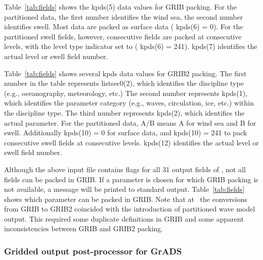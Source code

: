 Table~\ref{tab:fields} shows the {\F kpds(5)} data values for GRIB
packing. For the partitioned data, the first number identifies the wind sea,
the second number identifies swell. Most data are packed as surface data ({\F
kpds(6) = 0}). For the partitioned swell fields, however, consecutive fields
are packed at consecutive levels, with the level type indicator set to ({\F
kpds(6) = 241}). {\F kpds(7)} identifies the actual level or swell field
number.

Table~\ref{tab:fields} shows several {\F kpds} data values for GRIB2
packing. The first number in the table represents {\F listsec0(2)}, which
identifies the discipline type (e.g., oceanography, meteorology, etc.)  The
second number represents {\F kpds(1)}, which identifies the parameter category
(e.g., waves, circulation, ice, etc.) within the discipline type.  The third
number represents {\F kpds(2)}, which identifies the actual parameter.  For
the partitioned data, A/B means A for wind sea and B for swell.  Additionally
{\F kpds(10) = 0} for surface data, and {\F kpds(10) = 241 } to pack
consecutive swell fields at consecutive levels. {\F kpds(12)} identifies the
actual level or swell field number.

Although the above input file contains flags for all 31 output fields of \ws,
not all fields can be packed in GRIB. If a parameter is chosen for which GRIB
packing is not available, a message will be printed to standard
output. Table~\ref{tab:fields} shows which parameter can be packed in GRIB.
Note that at \ncep\ the conversions from GRIB to GRIB2 coincided with the
introduction of partitioned wave model output. This required some duplicate
definitions in GRIB and some apparent inconsistencies between GRIB and GRIB2
packing.


\pb
\vsssub
\subsubsection{Gridded output post-processor for GrADS} \label{sec:post_gf}
\vsssub


